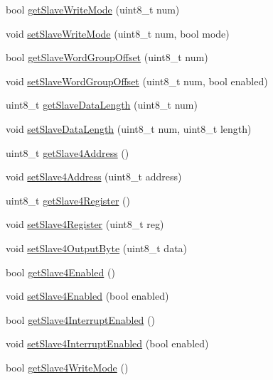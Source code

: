 \begin{DoxyCompactItemize}
\item 
bool \mbox{\hyperlink{class_m_p_u6050_adb99955fa66300b1f0bedfcdd8187412}{get\+Slave\+Write\+Mode}} (uint8\+\_\+t num)
\item 
void \mbox{\hyperlink{class_m_p_u6050_a3d9bfcb5394c7a382009cd2dc91ce801}{set\+Slave\+Write\+Mode}} (uint8\+\_\+t num, bool mode)
\item 
bool \mbox{\hyperlink{class_m_p_u6050_a32ce8023bb80afc5d55811de70c7214f}{get\+Slave\+Word\+Group\+Offset}} (uint8\+\_\+t num)
\item 
void \mbox{\hyperlink{class_m_p_u6050_a32602ab86f70b70d3313628fc6c010ae}{set\+Slave\+Word\+Group\+Offset}} (uint8\+\_\+t num, bool enabled)
\item 
uint8\+\_\+t \mbox{\hyperlink{class_m_p_u6050_a54c2a48b3cb79106bcaf75accf6cd311}{get\+Slave\+Data\+Length}} (uint8\+\_\+t num)
\item 
void \mbox{\hyperlink{class_m_p_u6050_ab4151353f433c533246d938fc3b78458}{set\+Slave\+Data\+Length}} (uint8\+\_\+t num, uint8\+\_\+t length)
\item 
uint8\+\_\+t \mbox{\hyperlink{class_m_p_u6050_a4278dec5fec25be9a6f45b51a3373ad2}{get\+Slave4\+Address}} ()
\item 
void \mbox{\hyperlink{class_m_p_u6050_a6985da2cbc37be3fefbe3c16bf8d34a6}{set\+Slave4\+Address}} (uint8\+\_\+t address)
\item 
uint8\+\_\+t \mbox{\hyperlink{class_m_p_u6050_a7bd548cb60ecceb27c72f026ec0a60f8}{get\+Slave4\+Register}} ()
\item 
void \mbox{\hyperlink{class_m_p_u6050_ae54dc358da048e61a1ac68012300fdaa}{set\+Slave4\+Register}} (uint8\+\_\+t reg)
\item 
void \mbox{\hyperlink{class_m_p_u6050_a17147a6f477be79f58889e9e6329392f}{set\+Slave4\+Output\+Byte}} (uint8\+\_\+t data)
\item 
bool \mbox{\hyperlink{class_m_p_u6050_a4b9e13d6776ba99e042773873557bedd}{get\+Slave4\+Enabled}} ()
\item 
void \mbox{\hyperlink{class_m_p_u6050_a04be2a8c3af6ef174f97769b9b5164a9}{set\+Slave4\+Enabled}} (bool enabled)
\item 
bool \mbox{\hyperlink{class_m_p_u6050_a051549bcfa2eeb848c8557fc3efe74da}{get\+Slave4\+Interrupt\+Enabled}} ()
\item 
void \mbox{\hyperlink{class_m_p_u6050_a7d7498ebc26f8a1fe8c9dcf40cd5d265}{set\+Slave4\+Interrupt\+Enabled}} (bool enabled)
\item 
bool \mbox{\hyperlink{class_m_p_u6050_a8d5a5e73907c78960154b92656127372}{get\+Slave4\+Write\+Mode}} ()

\end{DoxyCompactItemize}

